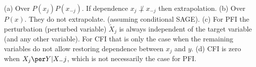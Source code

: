 (a) Over $P(x_j)P(x_{-j})$. If dependence $x_j \not \perp x_{-j}$ then extrapolation.
(b) Over $P(x)$. They do not extrapolate. (assuming conditional SAGE).
(c) For PFI the perturbation (perturbed variable) $\tilde{X}_j$ is always independent of the target variable (and any other variable). For CFI that is only the case when the remaining variables do not allow restoring dependence between $x_j$ and $y$.
(d) CFI is zero when $X_j \per Y | X_-j$, which is not necessarily the case for PFI.